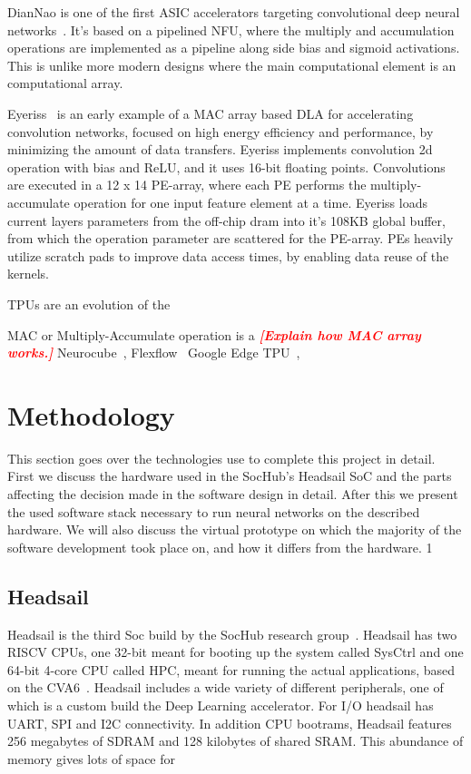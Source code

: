 \documentclass[12pt,a4paper,english
]{tunithesis}
\newcommand{\fixthis}[1]{\textbf{\textit{\textcolor{red}{[#1]}}}}
\begin{document}
DianNao is one of the first ASIC accelerators targeting convolutional deep neural networks~\cite{chen_diannao_2014}. It's based on a pipelined NFU, where the multiply and accumulation operations are implemented as a pipeline along side bias and sigmoid activations. This is unlike more modern designs where the main computational element is an computational array.

Eyeriss~\cite{chen_eyeriss_2017} is an early example of a MAC array based DLA for accelerating convolution networks, focused on high energy efficiency and performance, by minimizing the amount of data transfers. Eyeriss implements convolution 2d operation with bias and ReLU, and it uses 16-bit floating points. Convolutions are executed in a 12 x 14 PE-array, where each PE performs the multiply-accumulate operation for one input feature element at a time. Eyeriss loads current layers parameters from the off-chip dram into it's 108KB global buffer, from which the operation parameter are scattered for the PE-array. PEs heavily utilize scratch pads to improve data access times, by enabling data reuse of the kernels.

TPUs are an evolution of the

MAC or Multiply-Accumulate operation is a \fixthis{Explain how MAC array works.}
Neurocube~\cite{noauthor_neurocube_nodate}, Flexflow~\cite{lu_flexflow_2017} Google Edge TPU~\cite{EdgeTPU},


\chapter{Methodology}
This section goes over the technologies use to complete this project in detail. First we discuss the hardware used in the SocHub's Headsail SoC and the parts affecting the decision made in the software design in detail. After this we present the used software stack necessary to run neural networks on the described hardware. We will also discuss the virtual prototype on which the majority of the software development took place on, and how it differs from the hardware.   1
\label{ch:methodology}

\section{Headsail}
Headsail is the third Soc build by the SocHub research group~\parencite{Ballast}. Headsail has two RISCV CPUs, one 32-bit meant for booting up the system called SysCtrl and one 64-bit 4-core CPU called HPC, meant for running the actual applications, based on the CVA6~\cite{zaruba2019costCVA6}.
Headsail includes a wide variety of different peripherals, one of which is a custom build the Deep Learning accelerator.
For I/O headsail  has UART, SPI and I2C connectivity.
In addition CPU bootrams, Headsail features 256 megabytes of SDRAM and 128 kilobytes of shared SRAM. This abundance of memory gives lots of space for
\end{document}
